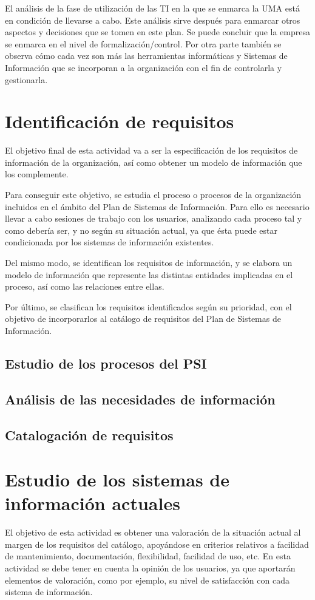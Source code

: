 \documentclass[11pt,a4paper,spanish,twoside]{book}
\begin{document}
El análisis de la fase de utilización de las TI en la que se enmarca la 
UMA está en condición de llevarse a cabo. Este análisis sirve después
para enmarcar otros aspectos y decisiones que se tomen en este plan. Se puede
concluir que la empresa se enmarca en el nivel de formalización/control. Por
otra parte también se observa cómo cada vez son más las herramientas
informáticas y Sistemas de Información que se incorporan a la organización
con el fin de controlarla y gestionarla. 

\chapter{Identificación de requisitos}
El objetivo final de esta actividad va a ser la especificación de los
requisitos de información de la organización, así como obtener un modelo de
información que los complemente.

Para conseguir este objetivo, se estudia el proceso o procesos de la
organización incluidos en el ámbito del Plan de Sistemas de Información. Para
ello es necesario llevar a cabo sesiones de trabajo con los usuarios,
analizando cada proceso tal y como debería ser, y no según su situación
actual, ya que ésta puede estar condicionada por los sistemas de información
existentes. 

Del mismo modo, se identifican los requisitos de información, y
se elabora un modelo de información que represente las distintas entidades
implicadas en el proceso, así como las relaciones entre ellas. 

Por último, se clasifican los requisitos identificados según su prioridad,
con el objetivo de incorporarlos al catálogo de requisitos del Plan de
Sistemas de Información. 

\section{Estudio de los procesos del PSI}


\section{Análisis de las necesidades de información}

\section{Catalogación de requisitos}


\chapter{Estudio de los sistemas de información actuales}
El objetivo de esta actividad es obtener una valoración de la situación
actual al margen de los requisitos del catálogo, apoyándose en criterios
relativos a facilidad de mantenimiento, documentación, flexibilidad,
facilidad de uso, etc. En esta actividad se debe tener en cuenta la opinión
de los usuarios, ya que aportarán elementos de valoración, como por ejemplo,
su nivel de satisfacción con cada sistema de información. 
\end{document}
